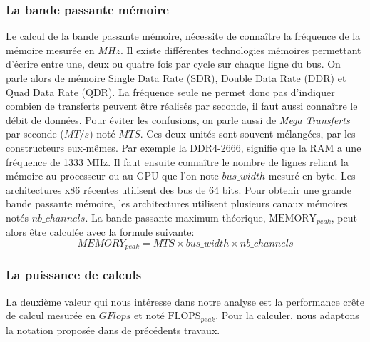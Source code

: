     \subsubsection{La bande passante mémoire}
        Le calcul de la bande passante mémoire, nécessite de connaître la fréquence de la mémoire mesurée en $MHz$. Il existe différentes technologies mémoires permettant d'écrire entre une, deux ou quatre fois par cycle sur chaque ligne du bus. On parle alors de mémoire Single Data Rate (SDR), Double Data Rate (DDR) et Quad Data Rate (QDR). La fréquence seule ne permet donc pas d'indiquer combien de transferts peuvent être réalisés par seconde, il faut aussi connaître le débit de données. Pour éviter les confusions, on parle aussi de \textit{Mega Transferts} par seconde ($MT/s$) noté $MTS$. Ces deux unités sont souvent mélangées, par les constructeurs eux-mêmes. Par exemple la DDR4-2666, signifie que la RAM a une fréquence de 1333 MHz. Il faut ensuite connaître le nombre de lignes reliant la mémoire au processeur ou au GPU que l'on note $bus\_width$ mesuré en byte. Les architectures x86 récentes utilisent des bus de 64 bits. Pour obtenir une grande bande passante mémoire, les architectures utilisent plusieurs canaux mémoires notés $nb\_channels$.
        La bande passante maximum théorique, $\text{MEMORY}_{peak}$, peut alors être calculée avec la formule suivante:
        \begin{equation}
        \label{eq:bw}
            MEMORY_{peak} = MTS \times bus\_width \times nb\_channels
        \end{equation}
    
    
    \subsubsection{La puissance de calculs}
        La deuxième valeur qui nous intéresse dans notre analyse est la performance crête de calcul mesurée en $GFlops$ et noté $\text{FLOPS}_{peak}$. Pour la calculer, nous adaptons la notation proposée dans de précédents travaux\cite{dolbeau2015theoretical}.
        
